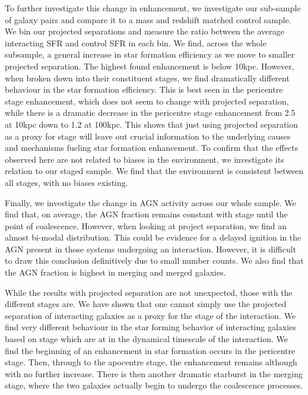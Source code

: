 To further investigate this change in enhancement, we investigate our sub-sample of galaxy pairs and compare it to a mass and redshift matched control sample. We bin our projected separations and measure the ratio between the average interacting SFR and control SFR in each bin. We find, across the whole subsample, a general increase in star formation efficiency as we move to smaller projected separation. The highest found enhancement is below 10kpc. However, when broken down into their constituent stages, we find dramatically different behaviour in the star formation efficiency. This is best seen in the pericentre stage enhancement, which does not seem to change with projected separation, while there is a dramatic decrease in the pericentre stage enhancement from 2.5 at 10kpc down to 1.2 at 100kpc. This shows that just using projected separation as a proxy for stage will leave out crucial information to the underlying causes and mechanisms fueling star formation enhancement. To confirm that the effects observed here are not related to biases in the environment, we investigate its relation to our staged sample. We find that the environment is consistent between all stages, with no biases existing.

Finally, we investigate the change in AGN activity across our whole sample. We find that, on average, the AGN fraction remains constant with stage until the point of coalescence. However, when looking at project separation, we find an almost bi-modal distribution. This could be evidence for a delayed ignition in the AGN present in those systems undergoing an interaction. However, it is difficult to draw this conclusion definitively due to small number counts. We also find that the AGN fraction is highest in merging and merged galaxies.

While the results with projected separation are not unexpected, those with the different stages are. We have shown that one cannot simply use the projected separation of interacting galaxies as a proxy for the stage of the interaction. We find very different behaviour in the star forming behavior of interacting galaxies based on stage which are at in the dynamical timescale of the interaction. We find the beginning of an enhancement in star formation occurs in the pericentre stage. Then, through to the apocentre stage, the enhancement remains although with no further increase. There is then another dramatic starburst in the merging stage, where the two galaxies actually begin to undergo the coalescence processes.

